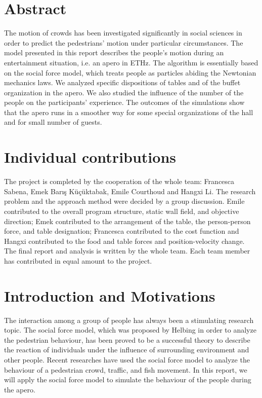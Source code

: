 \documentclass[11pt]{article}
\begin{document}



\section{Abstract}
The motion of crowds has been investigated significantly in social sciences in order to predict the pedestrians' motion under particular circumstances. The model presented in this report describes the people's motion during an entertainment situation, i.e. an apero in ETHz. The algorithm is essentially based on the social force model\cite{Socialforce}, which treats people as particles abiding the Newtonian mechanics laws. We analyzed specific dispositions of tables and of the buffet organization in the apero. We also studied the influence of the number of the people on the participants' experience. The outcomes of the simulations show that the apero runs in a smoother way for some special organizations of the hall and for small number of guests.

\section{Individual contributions}

The project is completed by the cooperation of the whole team: Francesca Sabena, Emek Barış Küçüktabak, Emile Courthoud and Hangxi Li. The research problem and the approach method were decided by a group discussion. Emile contributed to the overall program structure, static wall field, and objective direction; Emek contributed to the arrangement of the table, the person-person force, and table designation; Francesca contributed to the cost function and Hangxi contributed to the food and table forces and position-velocity change. The final report and analysis is written by the whole team. Each team member has contributed in equal amount to the project.

\section{Introduction and Motivations}
The interaction among a group of people has always been a stimulating research topic. The social force model, which was proposed by Helbing\cite{Socialforce,ModificationSocialforce} in order to analyze the pedestrian behaviour, has been proved to be a successful theory to describe the reaction of individuals under the influence of surrounding environment and other people. Recent researches have used the social force model to analyze the behaviour of a pedestrian crowd\cite{crowd1,crowd2,crowd3,traffic3crowd4}, traffic\cite{traffic1,traffic2,traffic3crowd4}, and fish movement\cite{fish}. In this report, we will apply the social force model to simulate the behaviour of the people during the apero. 
\end{document}
